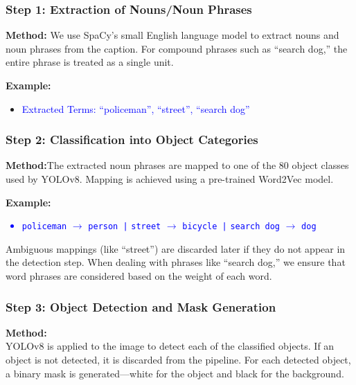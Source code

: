 \documentclass[11pt,letterpaper]{article}
\begin{document}
\subsubsection*{Step 1: Extraction of Nouns/Noun Phrases}

\textbf{Method:} We use SpaCy's small English language model to extract nouns and noun phrases from the caption. For compound phrases such as ``search dog,'' the entire phrase is treated as a single unit.

\noindent
\textbf{Example:}
\begin{itemize}
  \item \textcolor{blue}{ Extracted Terms: ``policeman'', ``street'', ``search dog''}
\end{itemize}


\subsubsection*{Step 2: Classification into Object Categories}

\textbf{Method:}The extracted noun phrases are mapped to one of the 80 object classes used by YOLOv8. Mapping is achieved using a pre-trained Word2Vec model.


\noindent
\textbf{Example:}
\textcolor{blue}{\begin{itemize}
  \item \texttt{policeman} $\to$ \texttt{person |}
  \texttt{street} $\to$ \texttt{bicycle |}
  \texttt{search dog} $\to$ \texttt{dog}
\end{itemize}}

\noindent
Ambiguous mappings (like ``street'') are discarded later if they do not appear in the detection step. When dealing with phrases like ``search dog,'' we ensure that word phrases are considered based on the weight of each word.



\subsubsection*{Step 3: Object Detection and Mask Generation}

\noindent
\textbf{Method:} \\
YOLOv8 is applied to the image to detect each of the classified objects. If an object is not detected, it is discarded from the pipeline. For each detected object, a binary mask is generated—white for the object and black for the background.
\end{document}
